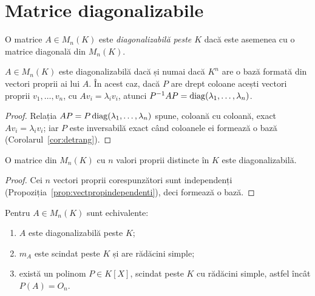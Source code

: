\section{Matrice diagonalizabile}

\begin{definitie}
O matrice $A\in M_n(K)$ este \emph{diagonalizabilă peste $K$} dacă este asemenea cu o matrice diagonală din $M_n(K)$.
\end{definitie}

\begin{teorema}\label{teo:diagvectori}
$A\in M_n(K)$ este diagonalizabilă dacă și numai dacă $K^n$ are o bază formată din vectori proprii ai lui $A$. În acest caz, dacă $P$ are drept coloane acești vectori proprii $v_1,\dots,v_n$, cu $Av_i=\lambda_iv_i$, atunci $P^{-1}AP=\operatorname{diag}(\lambda_1,\dots,\lambda_n)$.
\end{teorema}

\begin{proof}
Relația $AP=P\operatorname{diag}(\lambda_1,\dots,\lambda_n)$ spune, coloană cu coloană, exact $Av_i=\lambda_iv_i$; iar $P$ este inversabilă exact când coloanele ei formează o bază (Corolarul~\ref{cor:detrang}).
\end{proof}

\begin{corolar}\label{cor:valpropdistincte}
O matrice din $M_n(K)$ cu $n$ valori proprii distincte în $K$ este diagonalizabilă.
\end{corolar}

\begin{proof}
Cei $n$ vectori proprii corespunzători sunt independenți (Propoziția~\ref{prop:vectpropindependenti}), deci formează o bază.
\end{proof}

\begin{teorema}\label{teo:criteriudiag}
Pentru $A\in M_n(K)$ sunt echivalente:
\begin{enumerate}
\item[(a)] $A$ este diagonalizabilă peste $K$;
\item[(b)] $m_A$ este scindat peste $K$ și are rădăcini simple;
\item[(c)] există un polinom $P\in K[X]$, scindat peste $K$ cu rădăcini simple, astfel încât $P(A)=O_n$.
\end{enumerate}
\end{teorema}

